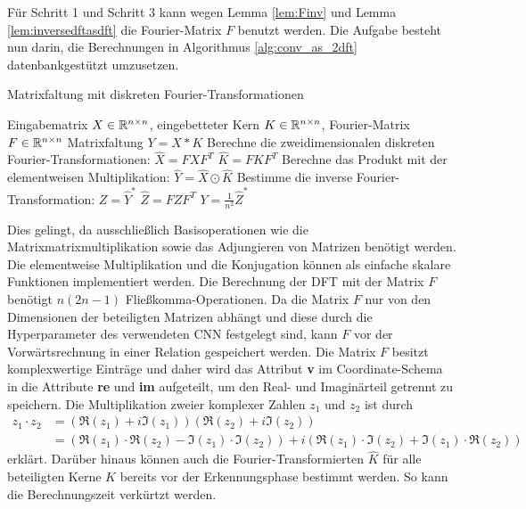 Für Schritt 1 und Schritt 3 kann wegen Lemma \ref{lem:Finv} und Lemma \ref{lem:inversedftasdft} die Fourier-Matrix $F$ benutzt werden. Die Aufgabe besteht nun darin, die Berechnungen in Algorithmus \ref{alg:conv_as_2dft} datenbankgestützt umzusetzen. 
\begin{algorithm}[H]
    \caption{Matrixfaltung mit diskreten Fourier-Transformationen}
    \label{alg:conv_as_2dft}
    \begin{algorithmic}
    \Require  Eingabematrix $X \in \mathbb{R}^{n \times n}$, eingebetteter Kern $K \in \mathbb{R}^{n \times n}$, Fourier-Matrix $F \in \mathbb{R}^{n \times n}$ 
    \Ensure Matrixfaltung $Y= X \ast K$
    \State Berechne die zweidimensionalen diskreten Fourier-Transformationen:
    \State $\hat{X}=F X F^T$
    \State $\hat{K}=F K F^T$ 
    \State Berechne das Produkt mit der elementweisen Multiplikation:
    \State $\hat{Y}= \hat{X} \odot \hat{K}$
    \State Bestimme die inverse Fourier-Transformation:  
    \State $Z=\hat{Y}^*$
    \State $\hat{Z}=F Z F^T$
    \State $Y=\frac{1}{n^2}\hat{Z}^*$
    \end{algorithmic}
\end{algorithm}

Dies gelingt, da ausschließlich Basisoperationen wie die Matrixmatrixmultiplikation sowie das Adjungieren von Matrizen benötigt werden. Die elementweise Multiplikation und die Konjugation können als einfache skalare Funktionen implementiert werden. Die Berechnung der DFT mit der Matrix $F$ benötigt $n(2n-1)$ Fließkomma-Operationen. Da die Matrix $F$ nur von den Dimensionen der beteiligten Matrizen abhängt und diese durch die Hyperparameter des verwendeten CNN festgelegt sind, kann $F$ vor der Vorwärtsrechnung in einer Relation gespeichert werden. 
Die Matrix $F$ besitzt komplexwertige Einträge und daher wird das Attribut \textbf{v} im Coordinate-Schema in die Attribute \textbf{re} und \textbf{im} aufgeteilt, um den Real- und Imaginärteil getrennt zu speichern. Die Multiplikation zweier komplexer Zahlen $z_1$ und $z_2$ ist durch
\begin{align*}
    z_1 \cdot z_2 &=(\Re(z_1)+ i \Im(z_1))(\Re(z_2)+i \Im(z_2))\\
    &=(\Re(z_1) \cdot \Re(z_2)-\Im(z_1) \cdot \Im(z_2))+ i (\Re(z_1) \cdot \Im(z_2)+ \Im(z_1) \cdot \Re(z_2))
\end{align*}
erklärt.
Darüber hinaus können auch die Fourier-Transformierten $\hat{K}$ für alle beteiligten Kerne $K$ bereits vor der Erkennungsphase bestimmt werden. So kann die Berechnungszeit verkürtzt werden.

